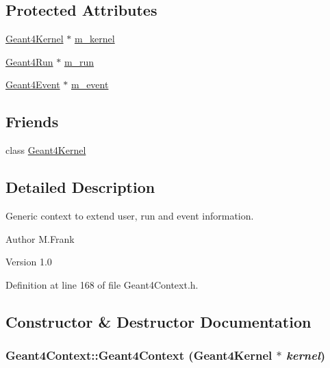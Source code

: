 \subsection*{Protected Attributes}
\begin{DoxyCompactItemize}
\item 
\hyperlink{class_d_d4hep_1_1_simulation_1_1_geant4_kernel}{Geant4Kernel} $\ast$ \hyperlink{class_d_d4hep_1_1_simulation_1_1_geant4_context_a039b270efa705522ec33989d69518c49}{m\_\-kernel}
\item 
\hyperlink{class_d_d4hep_1_1_simulation_1_1_geant4_run}{Geant4Run} $\ast$ \hyperlink{class_d_d4hep_1_1_simulation_1_1_geant4_context_a87c4aed90cd013934b16b5307b65184c}{m\_\-run}
\item 
\hyperlink{class_d_d4hep_1_1_simulation_1_1_geant4_event}{Geant4Event} $\ast$ \hyperlink{class_d_d4hep_1_1_simulation_1_1_geant4_context_a3aba509b9246b6e8b8c89a9bf61b9a4c}{m\_\-event}
\end{DoxyCompactItemize}
\subsection*{Friends}
\begin{DoxyCompactItemize}
\item 
class \hyperlink{class_d_d4hep_1_1_simulation_1_1_geant4_context_ade874a98c0c1bcb1b8c2d456037b3f5a}{Geant4Kernel}
\end{DoxyCompactItemize}


\subsection{Detailed Description}
Generic context to extend user, run and event information. \begin{DoxyAuthor}{Author}
M.Frank 
\end{DoxyAuthor}
\begin{DoxyVersion}{Version}
1.0 
\end{DoxyVersion}


Definition at line 168 of file Geant4Context.h.

\subsection{Constructor \& Destructor Documentation}
\hypertarget{class_d_d4hep_1_1_simulation_1_1_geant4_context_a95592e635ace3345c980cb855cd370a6}{
\subsubsection[{Geant4Context}]{\setlength{\rightskip}{0pt plus 5cm}Geant4Context::Geant4Context ({\bf Geant4Kernel} $\ast$ {\em kernel})}}
\label{class_d_d4hep_1_1_simulation_1_1_geant4_context_a95592e635ace3345c980cb855cd370a6}


